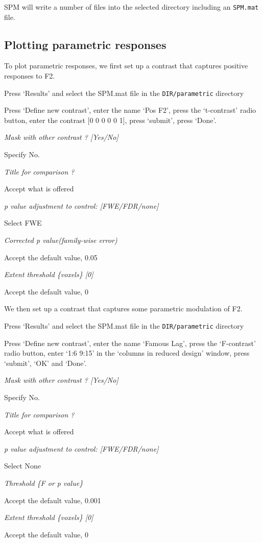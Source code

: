 SPM will write a number of files into the selected directory including an \verb!SPM.mat! file.

\subsection{Plotting parametric responses}

To plot parametric responses, we first set up a contrast that captures positive responses to F2.

\bi
\item{Press `Results' and select the SPM.mat file in the \verb!DIR/parametric! directory}
\item{Press `Define new contrast', enter the name `Pos F2', press the `t-contrast' radio button, enter the contrast [0 0 0 0 0 1], press `submit', press `Done'.}
\item{\em Mask with other contrast ? [Yes/No]}
\item{Specify No.}
\item{\em Title for comparison ?}
\item{Accept what is offered}
\item{\em p value adjustment to control: [FWE/FDR/none]}
\item{Select FWE}
\item{\em Corrected p value(family-wise error)}
\item{Accept the default value, 0.05}
\item{\em Extent threshold \{voxels\} [0]}
\item{Accept the default value, 0}
\ei

We then set up a contrast that captures some parametric modulation of F2.

\bi
\item{Press `Results' and select the SPM.mat file in the \verb!DIR/parametric! directory}
\item{Press `Define new contrast', enter the name `Famous Lag', press the `F-contrast' radio button, enter `1:6 9:15' in the `columns in reduced design' window, press `submit', `OK' and `Done'.}
\item{\em Mask with other contrast ? [Yes/No]}
\item{Specify No.}
\item{\em Title for comparison ?}
\item{Accept what is offered}
\item{\em p value adjustment to control: [FWE/FDR/none]}
\item{Select None}
\item{\em Threshold \{F or p value\}}
\item{Accept the default value, 0.001}
\item{\em Extent threshold \{voxels\} [0]}
\item{Accept the default value, 0}
\ei

